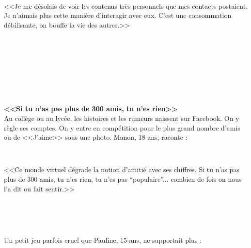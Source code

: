 \documentclass[11pt,twoside,a4paper]{article}
\begin{document}
\begin{minipage}[h]{0.55\textwidth}
	\begin{minipage}[h]{0.10\textwidth} ~\\ \end{minipage} \hfill \begin{minipage}[h]{0.70\textwidth}
		<<Je me d{\'e}solais de voir les contenus tr{\`e}s personnels que mes contacts postaient. Je n'aimais plus cette mani{\`e}re d'interagir avec eux. C'est une consommation d{\'e}bilisante, on bouffe la vie des autres.>>
	\end{minipage} \hfill \begin{minipage}[h]{0.15\textwidth} ~\\ \end{minipage} ~\\~\\	
\end{minipage} ~\\ ~\\

\textbf{<<Si tu n'as pas plus de 300 amis, tu n'es rien>>}~\\

Au coll{\`e}ge ou au lyc{\'e}e, les histoires et les rumeurs naissent sur Facebook. On y r{\`e}gle ses comptes. On y entre en comp{\'e}tition pour le plus grand nombre d'amis ou de <<J'aime>> sous une photo. Manon, 18 ans, raconte : ~\\

\begin{minipage}[h]{0.10\textwidth} ~\\ \end{minipage} \hfill \begin{minipage}[h]{0.70\textwidth}
	<<Ce monde virtuel d{\'e}grade la notion d'amiti{\'e} avec ses chiffres. Si tu n'as pas plus de 300 amis, tu n'es rien, tu n'es pas ``populaire''... combien de fois on nous l'a dit ou fait sentir.>>
\end{minipage} \hfill \begin{minipage}[h]{0.15\textwidth} ~\\ \end{minipage} ~\\~\\

Un petit jeu parfois cruel que Pauline, 15 ans, ne supportait plus : ~\\
\end{document}
